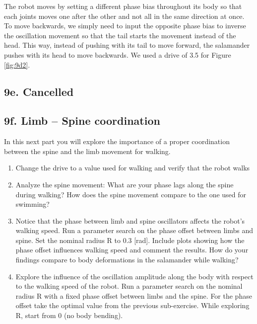 \documentclass{cmc}
\begin{document}
 
\hspace{6mm}The robot moves by setting a different phase bias throughout its body so that each joints moves one after the other and not all in the same direction at once. To move backwards, we simply need to input the opposite phase bias to inverse the oscillation movement so that the tail starts the movement instead of the head. This way, instead of pushing with its tail to move forward, the salamander pushes with its head to move backwards. We used a drive of 3.5 for Figure \ref{fig:9d2}.


\subsection*{9e. Cancelled}

\subsection*{9f. Limb – Spine coordination}
\label{sec:limb-spine-coordination}

In this next part you will explore the importance of a proper coordination
between the spine and the limb movement for walking.

\begin{enumerate}
\item Change the drive to a value used for walking and verify that the robot
  walks
\item Analyze the spine movement: What are your phase lags along the spine
  during walking? How does the spine movement compare to the one used for
  swimming?

  
\item Notice that the phase between limb and spine oscillators affects the
  robot’s walking speed. Run a parameter search on the phase offset between
  limbs and spine. Set the nominal radius R to 0.3 [rad]. Include plots showing
  how the phase offset influences walking speed and comment the results. How do
  your findings compare to body deformations in the salamander while walking?
 

\item Explore the influence of the oscillation amplitude along the body with
  respect to the walking speed of the robot. Run a parameter search on the
  nominal radius R with a fixed phase offset between limbs and the spine. For
  the phase offset take the optimal value from the previous sub-exercise. While
  exploring R, start from 0 (no body bending).
\end{enumerate}
\end{document}
